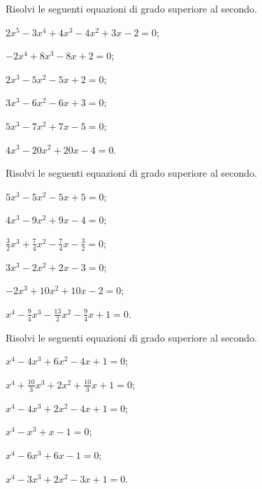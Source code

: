 \begin{esercizio}[\Ast] %
Risolvi le seguenti equazioni di grado superiore al secondo.
\begin{multicols}{2}
\begin{enumeratea}
\item $2x^5-3x^4+4x^3-4x^2+3x-2=0$;
\item $-2x^4+8x^3-8x+2=0$;
\item $2x^3-5x^2-5x+2=0$;
\item $3x^3-6x^2-6x+3=0$;
\item $5x^3-7x^2+7x-5=0$;
\item $4x^3-20x^2+20x-4=0$.
\end{enumeratea}
\end{multicols}
\end{esercizio}

\begin{esercizio}[\Ast] %
Risolvi le seguenti equazioni di grado superiore al secondo.
\begin{multicols}{2}
\begin{enumeratea}
\item $5x^3-5x^2-5x+5=0$;
\item $4x^3-9x^2+9x-4=0$;
\item $\frac 3 2x^3+\frac 7 4x^2-\frac 7 4x-\frac 3 2=0$;
\item $3x^3-2x^2+2x-3=0$;
\item $-2x^3+10x^2+10x-2=0$;
\item $x^4-\frac 9 4x^3-\frac{13} 2x^2-\frac 9 4x+1=0$.
\end{enumeratea}
\end{multicols}
\end{esercizio}

\begin{esercizio}[\Ast] %
Risolvi le seguenti equazioni di grado superiore al secondo.
\begin{multicols}{2}
\begin{enumeratea}
\item $x^4-4x^3+6x^2-4x+1=0$;
\item $x^4+\frac{10} 3x^3+2x^2+\frac{10} 3x+1=0$;
\item $x^4-4x^3+2x^2-4x+1=0$;
\item $x^4-x^3+x-1=0$;
\item $x^4-6x^3+6x-1=0$;
\item $x^4-3x^3+2x^2-3x+1=0$.
\end{enumeratea}
\end{multicols}
\end{esercizio}

